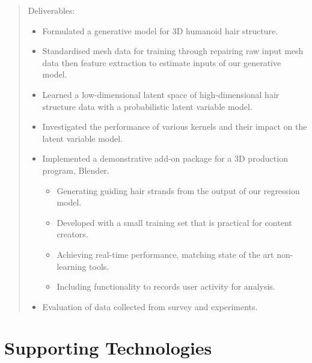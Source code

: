 \documentclass[ %
author={Dillon Keith Diep},
supervisor={Dr. Carl Henrik Ek},
degree={MEng},
title={ART-CG Hair:},
subtitle={Assisted Real-time Content Generation of Stylised Virtual Hair},
type={Research},
year={2017} ]{dissertation}
\begin{document}
\begin{quote}
	Deliverables:
	\begin{itemize}
		\item Formulated a generative model for 3D humanoid hair structure.
		\item Standardised mesh data for training through repairing raw input mesh data then feature extraction to estimate inputs of our generative model.
		\item Learned a low-dimensional latent space of high-dimensional hair structure data with a probabilistic latent variable model.
		\item Investigated the performance of various kernels and their impact on the latent variable model.
		\item Implemented a demonstrative add-on package for a 3D production program, Blender.
		\begin{itemize}
			\item Generating guiding hair strands from the output of our regression model.
			\item Developed with a small training set that is practical for content creators.
			\item Achieving real-time performance, matching state of the art non-learning tools.
			\item Including functionality to records user activity for analysis.
		\end{itemize}
		\item Evaluation of data collected from survey and experiments.
	\end{itemize}
\end{quote}


\chapter*{Supporting Technologies}
\end{document}

